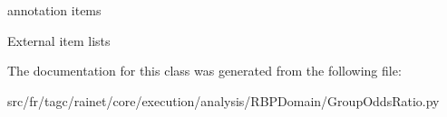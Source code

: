 annotation items 

External item lists 

The documentation for this class was generated from the following file\-:\begin{DoxyCompactItemize}
\item 
src/fr/tagc/rainet/core/execution/analysis/\-R\-B\-P\-Domain/Group\-Odds\-Ratio.\-py\end{DoxyCompactItemize}
